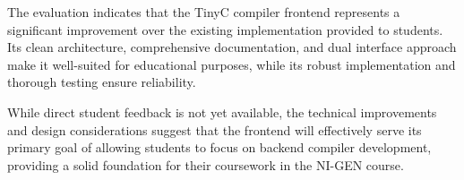 The evaluation indicates that the TinyC compiler frontend represents a significant improvement over the existing implementation provided to students. Its clean architecture, comprehensive documentation, and dual interface approach make it well-suited for educational purposes, while its robust implementation and thorough testing ensure reliability.

While direct student feedback is not yet available, the technical improvements and design considerations suggest that the frontend will effectively serve its primary goal of allowing students to focus on backend compiler development, providing a solid foundation for their coursework in the NI-GEN course.